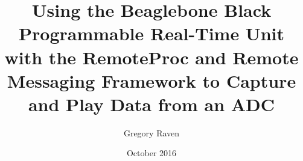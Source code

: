 \documentclass[a4paper,12pt]{book}
\begin{document}
\author{Gregory Raven}
\title{Using the Beaglebone Black Programmable Real-Time Unit with the RemoteProc and Remote Messaging Framework to Capture and Play Data from an ADC}
\date{October 2016}

\frontmatter

\maketitle
\tableofcontents

\mainmatter











\backmatter
\end{document}
